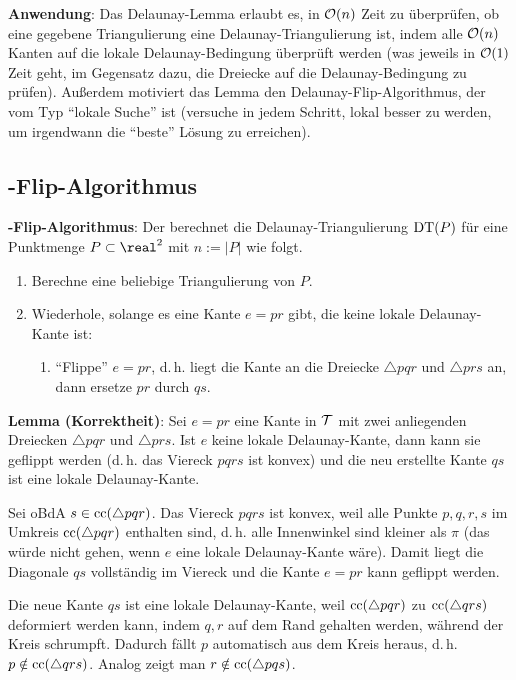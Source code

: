 \linie

\textbf{Anwendung}:
Das Delaunay-Lemma erlaubt es, in $\mathcal{O}(n)$ Zeit zu überprüfen, ob eine gegebene Triangulierung
eine Delaunay-Triangulierung ist, indem alle
$\mathcal{O}(n)$ Kanten auf die lokale Delaunay-Bedingung überprüft werden
(was jeweils in $\mathcal{O}(1)$ Zeit geht,
im Gegensatz dazu, die Dreiecke auf die Delaunay-Bedingung zu prüfen).
Außerdem motiviert das Lemma den Delaunay-Flip-Algorithmus, der vom Typ "`lokale Suche"' ist
(versuche in jedem Schritt, lokal besser zu werden, um irgendwann die "`beste"' Lösung zu
erreichen).

\pagebreak

\subsection{%
    -Flip-Algorithmus%
}

\textbf{-Flip-Algorithmus}:
Der  berechnet die Delaunay-Triangulierung $\operatorname{DT}(P)$
für eine Punktmenge $P \subset \real^2$ mit $n := |P|$ wie folgt.
\begin{enumerate}
    \item
    Berechne eine beliebige Triangulierung von $P$.
    
    \item
    Wiederhole, solange es eine Kante $e = pr$ gibt, die keine lokale Delaunay-Kante ist:
    \begin{enumerate}
        \item
        "`Flippe"' $e = pr$,
        d.\,h. liegt die Kante an die Dreiecke $\triangle pqr$ und $\triangle prs$ an,
        dann ersetze $pr$ durch $qs$.
    \end{enumerate}
\end{enumerate}

\linie

\textbf{Lemma (Korrektheit)}:
Sei $e = pr$ eine Kante in $\mathcal{T}$ mit zwei anliegenden Dreiecken $\triangle pqr$ und $\triangle prs$.
Ist $e$ keine lokale Delaunay-Kante, dann kann sie geflippt werden
(d.\,h. das Viereck $pqrs$ ist konvex)
und die neu erstellte Kante $qs$ ist eine lokale Delaunay-Kante.

\begin{Beweis}
    Sei oBdA $s \in \operatorname{cc}(\triangle pqr)$.
    Das Viereck $pqrs$ ist konvex, weil alle Punkte $p, q, r, s$ im Umkreis $\operatorname{cc}(\triangle pqr)$
    enthalten sind, d.\,h. alle Innenwinkel sind kleiner als $\pi$
    (das würde nicht gehen, wenn $e$ eine lokale Delaunay-Kante wäre).
    Damit liegt die Diagonale $qs$ vollständig im Viereck und die Kante $e = pr$ kann geflippt
    werden.
    
    Die neue Kante $qs$ ist eine lokale Delaunay-Kante, weil $\operatorname{cc}(\triangle pqr)$ zu
    $\operatorname{cc}(\triangle qrs)$ deformiert werden kann, indem $q, r$ auf dem Rand gehalten werden,
    während der Kreis schrumpft.
    Dadurch fällt $p$ automatisch aus dem Kreis heraus, d.\,h. $p \notin \operatorname{cc}(\triangle qrs)$.
    Analog zeigt man $r \notin \operatorname{cc}(\triangle pqs)$.
\end{Beweis}

